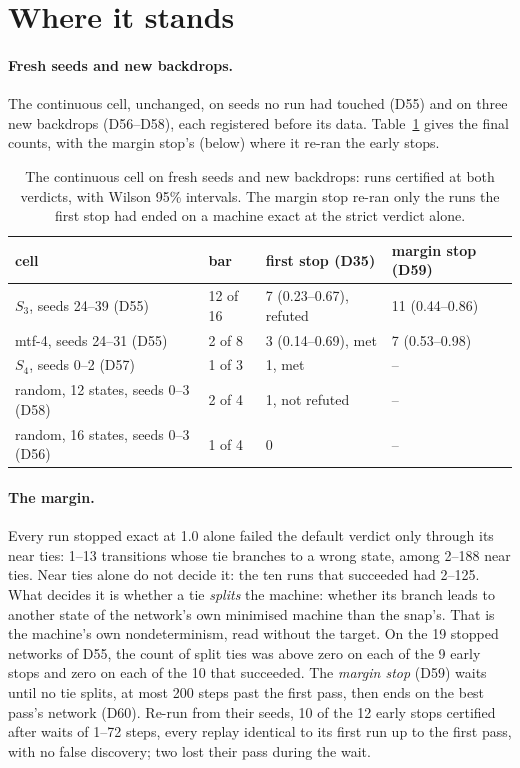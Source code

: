 \documentclass[11pt]{article}
\begin{document}
\section{Where it stands}
\label{sec:now}

\paragraph{Fresh seeds and new backdrops.} The continuous cell, unchanged, on seeds no run had
touched (D55) and on three new backdrops (D56--D58), each registered before its data.
Table~\ref{tab:now} gives the final counts, with the margin stop's (below) where it re-ran the early
stops.

\begin{table}[t]
\centering
\small
\begin{tabular}{@{}llll@{}}
\toprule
cell & bar & first stop (D35) & margin stop (D59) \\
\midrule
$S_3$, seeds 24--39 (D55) & 12 of 16 & 7 (0.23--0.67), refuted & 11 (0.44--0.86) \\
mtf-4, seeds 24--31 (D55) & 2 of 8 & 3 (0.14--0.69), met & 7 (0.53--0.98) \\
$S_4$, seeds 0--2 (D57) & 1 of 3 & 1, met & -- \\
random, 12 states, seeds 0--3 (D58) & 2 of 4 & 1, not refuted & -- \\
random, 16 states, seeds 0--3 (D56) & 1 of 4 & 0 & -- \\
\bottomrule
\end{tabular}
\caption{The continuous cell on fresh seeds and new backdrops: runs certified at both verdicts, with
Wilson 95\% intervals. The margin stop re-ran only the runs the first stop had ended on a machine
exact at the strict verdict alone.}
\label{tab:now}
\end{table}

\paragraph{The margin.} Every run stopped exact at 1.0 alone failed the default verdict only through
its near ties: 1--13 transitions whose tie branches to a wrong state, among 2--188 near ties. Near ties
alone do not decide it: the ten runs that succeeded had 2--125. What decides it is whether a tie
\emph{splits} the machine: whether its branch leads to another state of the network's own minimised
machine \citep{moore-1956-gedanken-experiments-sequential-machines} than the snap's. That is the
machine's own nondeterminism, read without the target. On the 19 stopped networks of D55, the count of
split ties was above zero on each of the 9 early stops and zero on each of the 10 that succeeded. The
\emph{margin stop} (D59) waits until no tie splits, at most 200 steps past the first pass, then ends
on the best pass's network (D60). Re-run from their seeds, 10 of the 12 early stops certified after
waits of 1--72 steps, every replay identical to its first run up to the first pass, with no false
discovery; two lost their pass during the wait.
\end{document}
